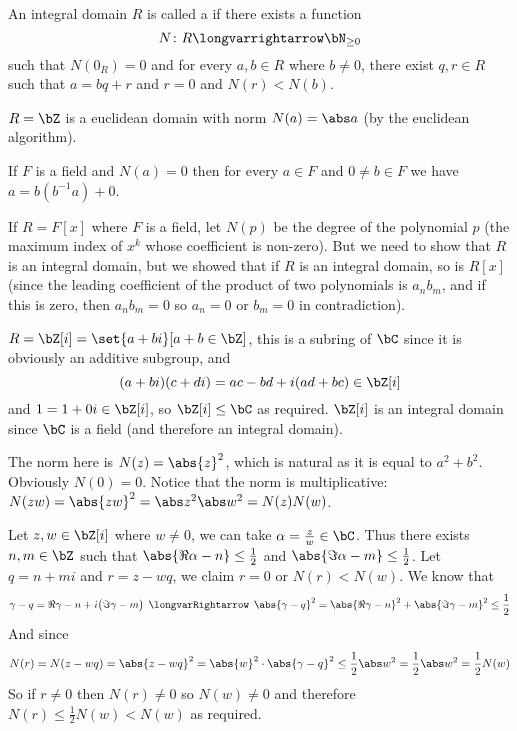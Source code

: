 \documentclass[10pt]{article}
\def\implies{\,\mathrel{\longvarRightarrow}\,}
\let\longto=\longvarrightarrow
\begin{document}


\bigskip

\begin{defn*}

    An integral domain $R$ is called a  if there exists a function
    \[ N\colon R\longto\bN_{\geq0} \]
    such that $N(0_R)=0$ and for every $a,b\in R$ where $b\neq0$, there exist $q,r\in R$ such that $a=bq+r$ and $r=0$ and $N(r)<N(b)$.

\end{defn*}

\begin{exam*}

    \benum
        \item $R=\bZ$ is a euclidean domain with norm $N(a)=\abs a$ (by the euclidean algorithm).
        \item If $F$ is a field and $N(a)=0$ then for every $a\in F$ and $0\neq b\in F$ we have $a=b(b^{-1}a)+0$.
        \item If $R=F[x]$ where $F$ is a field, let $N(p)$ be the degree of the polynomial $p$ (the maximum index of $x^k$ whose coefficient is non-zero).
        But we need to show that $R$ is an integral domain, but we showed that if $R$ is an integral domain, so is $R[x]$ (since the leading coefficient of the product of two polynomials is $a_nb_m$, and if
        this is zero, then $a_nb_m=0$ so $a_n=0$ or $b_m=0$ in contradiction).
        \item $R=\bZ[i]=\set{a+bi}[a+b\in\bZ]$, this is a subring of $\bC$ since it is obviously an additive subgroup, and
        \[ (a+bi)(c+di) = ac - bd + i(ad + bc) \in \bZ[i] \]
        and $1=1+0i\in\bZ[i]$, so $\bZ[i]\leq\bC$ as required.
        $\bZ[i]$ is an integral domain since $\bC$ is a field (and therefore an integral domain).

        The norm here is $N(z)=\abs{z}^2$, which is natural as it is equal to $a^2+b^2$.
        Obviously $N(0)=0$.
        Notice that the norm is multiplicative: $N(zw)=\abs{zw}^2=\abs z^2\abs w^2=N(z)N(w)$.

        Let $z,w\in\bZ[i]$ where $w\neq0$, we can take $\alpha=\frac zw\in\bC$.
        Thus there exists $n,m\in\bZ$ such that $\abs{\Re\alpha-n}\leq\frac12$ and $\abs{\Im\alpha-m}\leq\frac12$.
        Let $q=n+mi$ and $r=z-wq$, we claim $r=0$ or $N(r)<N(w)$.
        We know that
        \[ \gamma - q = \Re\gamma - n + i\bigl(\Im\gamma - m\bigr) \implies \abs{\gamma-q}^2 = \abs{\Re\gamma-n}^2 + \abs{\Im\gamma - m}^2 \leq \frac12 \]
        And since
        \[ N(r) = N(z-wq) = \abs{z-wq}^2 = \abs{w}^2\cdot\abs{\gamma-q}^2 \leq \frac12\abs w^2 = \frac12\abs w^2 = \frac12 N(w) \]
        So if $r\neq0$ then $N(r)\neq0$ so $N(w)\neq0$ and therefore $N(r)\leq\frac12N(w)<N(w)$ as required.
    \eenum

\end{exam*}
\end{document}
